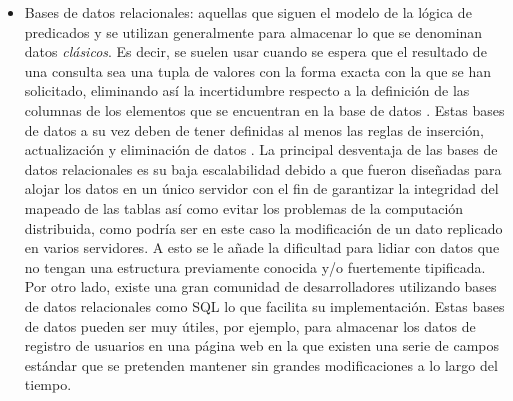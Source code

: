 \begin{itemize}

\item Bases de datos relacionales: aquellas que siguen el modelo de la lógica de predicados y se utilizan generalmente para almacenar lo que se denominan datos \textit{clásicos}. Es decir, se suelen usar cuando se espera que el resultado de una consulta sea una tupla de valores con la forma exacta con la que se han solicitado, eliminando así la incertidumbre respecto a la definición de las columnas de los elementos que se encuentran en la base de datos \citep{jimenez2016implementacion}. Estas bases de datos a su vez deben de tener definidas al menos las reglas de inserción, actualización y eliminación de datos \citep{codd1979extending}. La principal desventaja de las bases de datos relacionales es su baja escalabilidad debido a que fueron diseñadas para alojar los datos en un único servidor con el fin de garantizar la integridad del mapeado de las tablas así como evitar los problemas de la computación distribuida, como podría ser en este caso la modificación de un dato replicado en varios servidores. A esto se le añade la dificultad para lidiar con datos que no tengan una estructura previamente conocida y/o fuertemente tipificada. Por otro lado, existe una gran comunidad de desarrolladores utilizando bases de datos relacionales como SQL lo que facilita su implementación. Estas bases de datos pueden ser muy útiles, por ejemplo, para almacenar los datos de registro de usuarios en una página web en la que existen una serie de campos estándar que se pretenden mantener sin grandes modificaciones a lo largo del tiempo.


\end{itemize}
